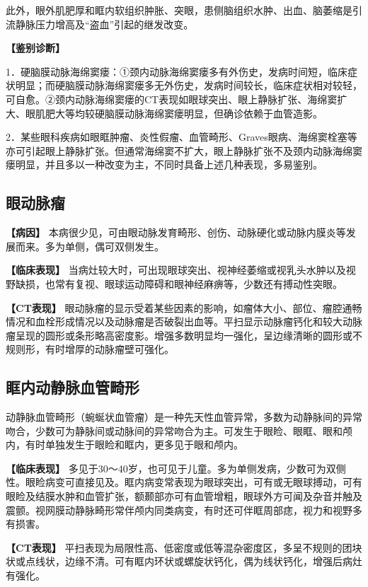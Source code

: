 此外，眼外肌肥厚和眶内软组织肿胀、突眼，患侧脑组织水肿、出血、脑萎缩是引流静脉压力增高及“盗血”引起的继发改变。

\textbf{【鉴别诊断】}

1．硬脑膜动脉海绵窦瘘：①颈内动脉海绵窦瘘多有外伤史，发病时间短，临床症状明显；而硬脑膜动脉海绵窦瘘多无外伤史，发病时间较长，临床症状相对较轻，可自愈。②颈内动脉海绵窦瘘的CT表现如眼球突出、眼上静脉扩张、海绵窦扩大、眼肌肥大等均较硬脑膜动脉海绵窦瘘明显，但确诊依赖于血管造影。

2．某些眼科疾病如眼眶肿瘤、炎性假瘤、血管畸形、Graves眼病、海绵窦栓塞等亦可引起眼上静脉扩张。但通常海绵窦不扩大，眼上静脉扩张不及颈内动脉海绵窦瘘明显，并且多以一种改变为主，不同时具备上述几种表现，多易鉴别。

\subsection{眼动脉瘤}

\textbf{【病因】}
本病很少见，可由眼动脉发育畸形、创伤、动脉硬化或动脉内膜炎等发展而来。多为单侧，偶可双侧发生。

\textbf{【临床表现】}
当病灶较大时，可出现眼球突出、视神经萎缩或视乳头水肿以及视野缺损，也常有复视、眼球运动障碍和眼神经麻痹等，少数还有搏动性突眼。

\textbf{【CT表现】}
眼动脉瘤的显示受着某些因素的影响，如瘤体大小、部位、瘤腔通畅情况和血栓形成情况以及动脉瘤是否破裂出血等。平扫显示动脉瘤钙化和较大动脉瘤呈现的圆形或条形略高密度影。增强多数明显均一强化，呈边缘清晰的圆形或不规则形，有时增厚的动脉瘤壁可强化。

\subsection{眶内动静脉血管畸形}

动静脉血管畸形（蜿蜒状血管瘤）是一种先天性血管异常，多数为动静脉间的异常吻合，少数可为静脉间或动脉间的异常吻合为主。可发生于眼睑、眼眶、眼和颅内，有时单独发生于眼睑和眶内，更多见于眼和颅内。

\textbf{【临床表现】}
多见于30～40岁，也可见于儿童。多为单侧发病，少数可为双侧性。眼睑病变可直接见及。眶内病变常表现为眼球突出，可有或无眼球搏动，可有眼睑及结膜水肿和血管扩张，额颞部亦可有血管增粗，眼球外方可闻及杂音并触及震颤。视网膜动静脉畸形常伴颅内同类病变，有时还可伴眶周部痣，视力和视野多有损害。

\textbf{【CT表现】}
平扫表现为局限性高、低密度或低等混杂密度区，多呈不规则的团块状或点线状，边缘不清。可有眶内环状或螺旋状钙化，偶为线状钙化，增强后病灶有强化。

